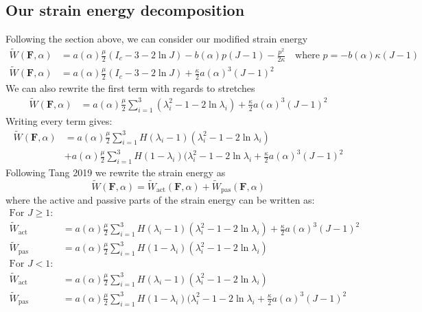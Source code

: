\documentclass[12pt,3p]{article}
\numberwithin{equation}{section}
\begin{document}
\subsection{Our strain energy decomposition}
Following the section above, we can consider our modified strain energy 
\begin{align*}
\widetilde{W} (\mathbf{F}, \alpha) 
	&= a(\alpha) \frac{\mu}{2} (I_c - 3 - 2 \ln J) - b(\alpha) p (J-1) - \frac{p^2}{2 \kappa} \quad \text{where } p = - b(\alpha) \kappa (J-1) \\
\widetilde{W} (\mathbf{F}, \alpha) 
	&= a(\alpha) \frac{\mu}{2} (I_c - 3 - 2 \ln J) + \frac{\kappa}{2} a(\alpha)^3 (J-1)^2
\end{align*}
We can also rewrite the first term with regards to stretches
\begin{align*}
\widetilde{W} (\mathbf{F}, \alpha) &= a(\alpha) \frac{\mu}{2} \sum_{i = 1}^3 (\lambda_i^2 - 1 - 2 \ln \lambda_i) + \frac{\kappa}{2} a(\alpha)^3 (J-1)^2
\end{align*}
Writing every term gives: 
\begin{align*}
\widetilde{W} (\mathbf{F}, \alpha) &= a(\alpha) \frac{\mu}{2} \sum_{i = 1}^3 H(\lambda_i - 1) (\lambda_i^2 - 1 - 2 \ln \lambda_i) \\
	&+ a(\alpha) \frac{\mu}{2} \sum_{i = 1}^3 H (1 - \lambda_i) (\lambda_i^2 - 1 - 2 \ln \lambda_i + \frac{\kappa}{2} a(\alpha)^3 (J-1)^2
\end{align*}
Following Tang 2019 we rewrite the strain energy as 
\begin{equation}
\widetilde{W} (\mathbf{F}, \alpha) = \widetilde{W}_\text{act} (\mathbf{F}, \alpha ) +\widetilde{W}_\text{pas} (\mathbf{F}, \alpha)
\end{equation}
where the active and passive parts of the strain energy can be written as: 
\begin{align*}
\text{For } J \geq 1: & \\
\widetilde{W}_\text{act} &= a(\alpha) \frac{\mu}{2} \sum_{i = 1}^3 H(\lambda_i - 1) (\lambda_i^2 - 1 - 2 \ln \lambda_i) + \frac{\kappa}{2} a(\alpha)^3 (J-1)^2 \\
\widetilde{W}_{\text{pas}} &= a(\alpha) \frac{\mu}{2} \sum_{i = 1}^3 H (1 - \lambda_i) (\lambda_i^2 - 1 - 2 \ln \lambda_i) \\
\text{For } J < 1: \\
\widetilde{W}_\text{act} &= a(\alpha) \frac{\mu}{2} \sum_{i = 1}^3 H(\lambda_i - 1) (\lambda_i^2 - 1 - 2 \ln \lambda_i) \\
\widetilde{W}_{\text{pas}} &= a(\alpha) \frac{\mu}{2} \sum_{i = 1}^3 H (1 - \lambda_i) (\lambda_i^2 - 1 - 2 \ln \lambda_i + \frac{\kappa}{2} a(\alpha)^3 (J-1)^2
\end{align*} 
\end{document}
